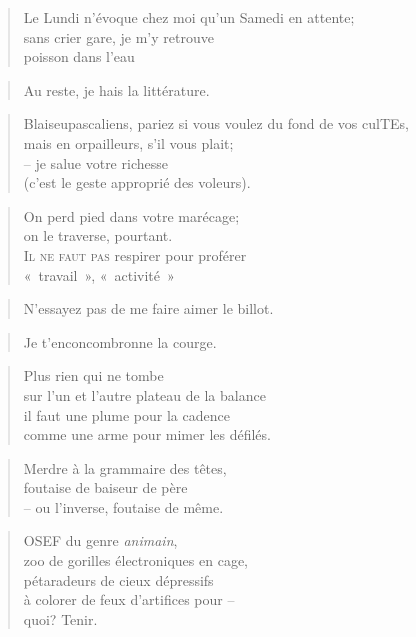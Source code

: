   \begin{verse}
    Le Lundi n’évoque chez moi qu’un Samedi en attente;\\
    sans crier gare, je m’y retrouve\\
    poisson dans l’eau\\
  \end{verse}
  \begin{verse}
    Au reste, je hais la littérature.
  \end{verse}
  \begin{verse}
    Blaiseupascaliens, pariez si vous voulez du fond de vos culTEs,\\
    mais en orpailleurs, s’il vous plait;\\
    -- je salue votre richesse\\
    (c’est le geste approprié des voleurs).\\
  \end{verse}
  \begin{verse}
    On perd pied dans votre marécage;\\
    on le traverse, pourtant.\\
    \textsc{Il ne faut pas} respirer pour proférer\\
    «~travail~», «~activité~»
  \end{verse}
  \begin{verse}
    N’essayez pas de me faire aimer le billot.
  \end{verse}
  \begin{quotation}
    Je t’enconcombronne la courge.
  \end{quotation}
  \begin{verse}
    Plus rien qui ne tombe\\
    sur l’un et l’autre plateau de la balance\\
    il faut une plume pour la cadence\\
    comme une arme pour mimer les défilés.
  \end{verse}
  \begin{verse}
    Merdre à la grammaire des têtes,\\
    foutaise de baiseur de père\\
    -- ou l’inverse, foutaise de même.
  \end{verse}
  \begin{verse}
    OSEF du genre \emph{animain},\\
    zoo de gorilles électroniques en cage,\\
    pétaradeurs de cieux dépressifs\\
    à colorer de feux d’artifices pour --\\
    quoi? Tenir.
  \end{verse}
